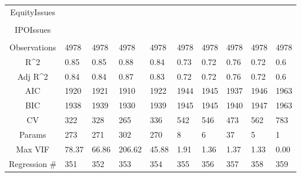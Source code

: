 \documentclass{article}
\begin{document}
\begin{table}[H]
\begin{tabular}{|clllllllll|}
  EquityIssues &  &  &  &  &  &  &  &  &  \\ 
   &  &  &  &  &  &  &  &  &  \\ 
  IPOIssues &  &  &  &  &  &  &  &  &  \\ 
   &  &  &  &  &  &  &  &  &  \\ 
  \hline 
 Observations & 4978 & 4978 & 4978 & 4978 & 4978 & 4978 & 4978 & 4978 & 4978 \\ 
  R^2 & 0.85 & 0.85 & 0.88 & 0.84 & 0.73 & 0.72 & 0.76 & 0.72 & 0.6 \\ 
  Adj R^2 & 0.84 & 0.84 & 0.87 & 0.83 & 0.72 & 0.72 & 0.76 & 0.72 & 0.6 \\ 
  AIC & 1920 & 1921 & 1910 & 1922 & 1944 & 1945 & 1937 & 1946 & 1963 \\ 
  BIC & 1938 & 1939 & 1930 & 1939 & 1945 & 1945 & 1940 & 1947 & 1963 \\ 
  CV & 322 & 328 & 265 & 336 & 542 & 546 & 473 & 562 & 783 \\ 
  Params & 273 & 271 & 302 & 270 & 8 & 6 & 37 & 5 & 1 \\ 
  Max VIF & 78.37 & 66.86 & 206.62 & 45.88 & 1.91 & 1.36 & 1.37 & 1.33 & 0.00 \\ 
  Regression \# & 351 & 352 & 353 & 354 & 355 & 356 & 357 & 358 & 359 \\ 
   \hline
\end{tabular}
 
\end{table}
\end{document}
